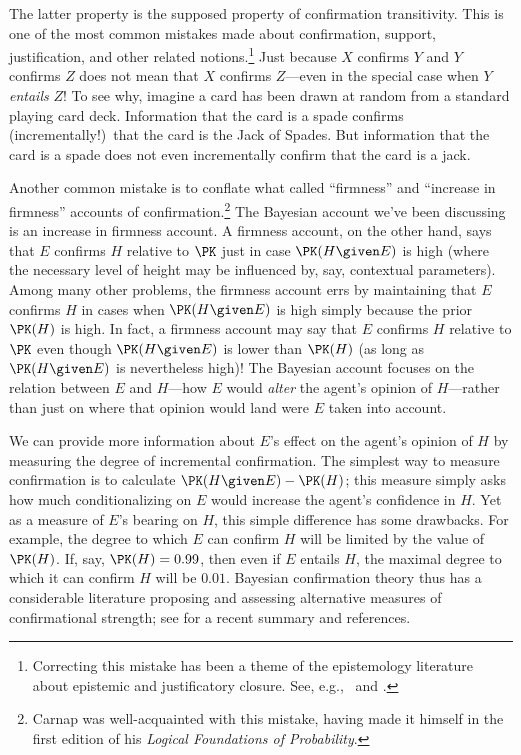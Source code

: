 The latter property is the supposed property of confirmation transitivity. This is one of the most common mistakes made about confirmation, support, justification, and other related notions.\footnote
{Correcting this mistake has been a theme of the epistemology literature about epistemic and justificatory closure. See, e.g.,\ \citet{DretskeOperators,DaviesArchitecturalism} and \citet{WrightReflections}.}
 Just because $X$ confirms $Y$ and $Y$ confirms $Z$ does not mean that $X$ confirms $Z$---even in the special case when $Y$ \emph{entails} $Z$! To see why, imagine a card has been drawn at random from a standard playing card deck. Information that the card is a spade confirms (incrementally!)\ that the card is the Jack of Spades. But information that the card is a spade does not even incrementally confirm that the card is a jack.
 
Another common mistake is to conflate what \citet{CarnapLogicalSecond} called ``firmness'' and ``increase in firmness'' accounts of confirmation.\footnote
{Carnap was well-acquainted with this mistake, having made it himself in the first \citeyear{CarnapLogical} edition of his \emph{Logical Foundations of Probability}.}
 The Bayesian account we've been discussing is an increase in firmness account. A firmness account, on the other hand, says that $E$ confirms $H$ relative to $\PK$ just in case $\PK(H \given E)$ is high (where the necessary level of height may be influenced by, say, contextual parameters). Among many other problems, the firmness account errs by maintaining that $E$ confirms $H$ in cases when $\PK(H \given E)$ is high simply because the prior $\PK(H)$ is high. In fact, a firmness account may say that $E$ confirms $H$ relative to $\PK$ even though $\PK(H \given E)$ is lower than $\PK(H)$ (as long as $\PK(H \given E)$ is nevertheless high)! The Bayesian account focuses on the relation between $E$ and $H$---how $E$ would \emph{alter} the agent's opinion of $H$---rather than just on where that opinion would land were $E$ taken into account.
 
We can provide more information about $E$'s effect on the agent's opinion of $H$ by measuring the degree of incremental confirmation. The simplest way to measure confirmation is to calculate $\PK(H \given E)-\PK(H)$; this measure simply asks how much conditionalizing on $E$ would increase the agent's confidence in $H$. Yet as a measure of $E$'s bearing on $H$, this simple difference has some drawbacks. For example, the degree to which $E$ can confirm $H$ will be limited by the value of $\PK(H)$. If, say, $\PK(H)=0.99$, then even if $E$ entails $H$, the maximal degree to which it can confirm $H$ will be $0.01$. Bayesian confirmation theory thus has a considerable literature proposing and assessing alternative measures of confirmational strength; see \citet[Section 3.4]{CrupiSEP} for a recent summary and references.

